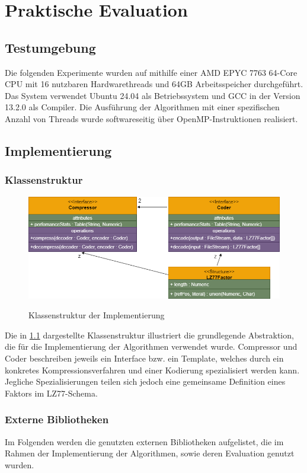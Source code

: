 \chapter{Praktische Evaluation}

\section{Testumgebung}
Die folgenden Experimente wurden auf mithilfe einer AMD EPYC 7763 64-Core CPU mit 16 nutzbaren Hardwarethreads und 64GB Arbeitsspeicher durchgeführt. Das System
verwendet Ubuntu 24.04 als Betriebssystem und GCC in der Version 13.2.0 als Compiler. Die Ausführung der Algorithmen mit einer spezifischen Anzahl von Threads wurde
softwareseitig über OpenMP-Instruktionen realisiert. 

\section{Implementierung}

\subsection{Klassenstruktur}
\begin{figure}[ht]
    \centering
    \caption{Klassenstruktur der Implementierung}
    \includegraphics[scale=0.4]{Images/uml.png} \label{uml}
\end{figure}

Die in \ref{uml} dargestellte Klassenstruktur illustriert die grundlegende Abstraktion, die für die Implementierung der Algorithmen verwendet wurde. Compressor und
Coder beschreiben jeweils ein Interface bzw. ein Template, welches durch ein konkretes Kompressionsverfahren und einer Kodierung spezialisiert werden kann. Jegliche
Spezialisierungen teilen sich jedoch eine gemeinsame Definition eines Faktors im LZ77-Schema.

\subsection{Externe Bibliotheken}
Im Folgenden werden die genutzten externen Bibliotheken aufgelistet, die im Rahmen der Implementierung der Algorithmen, sowie deren Evaluation genutzt wurden.
